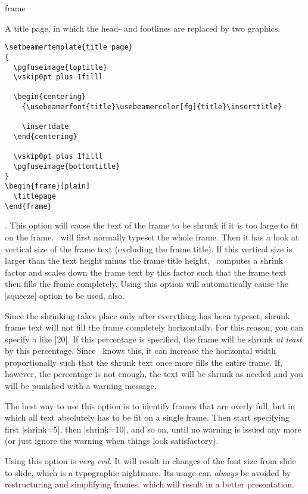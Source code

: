 \begin{environment}{{frame}%
    }
\begin{frame}[<+->][plain]
  \example A title page, in which the head- and footlines are replaced
  by two graphics.
\begin{verbatim}
\setbeamertemplate{title page}
{
  \pgfuseimage{toptitle}
  \vskip0pt plus 1filll

  \begin{centering}
    {\usebeamerfont{title}\usebeamercolor[fg]{title}\inserttitle}
    
    \insertdate
  \end{centering}

  \vskip0pt plus 1filll
  \pgfuseimage{bottomtitle}
}
\begin{frame}[plain]
  \titlepage
\end{frame}
\end{verbatim}
  \item
    . This
    option will cause the text of the frame to be shrunk if it is
    too large to fit on the frame. \beamer\ will first normally
    typeset the whole frame. Then it has a look at vertical size of
    the frame text (excluding the frame title). If this vertical size
    is larger than  the text height minus the frame title height,
    \beamer\ computes a shrink factor and scales down the frame text
    by this factor such that the frame text then fills the frame
    completely. Using this option will automatically cause the
    |squeeze| option to be used, also.

    Since the shrinking takes place only after everything has been
    typeset, shrunk frame text will not fill the frame completely
    horizontally. For this reason, you can specify a  like |20|. If this percentage is specified, the
    frame will be shrunk \emph{at least} by this percentage. Since
    \beamer\ knows this, it can increase the horizontal width
    proportionally such that the shrunk text once more fills the
    entire frame. If, however, the percentage is not enough, the text
    will be shrunk as needed and you will be punished with a warning
    message.

    The best way to use this option is to identify frames that are
    overly full, but in which all text absolutely has to be fit on a
    single frame. Then start specifying first |shrink=5|, then
    |shrink=10|, and so on, until no warning is issued any more (or
    just ignore the warning when things look satisfactory).

    Using this option is \emph{very evil}. It will
    result in changes of the font size from slide to slide, which is a
    typographic nightmare. Its usage can \emph{always} be avoided by
    restructuring and simplifying frames, which will result in a
    better presentation.


\end{frame}
\end{environment}
